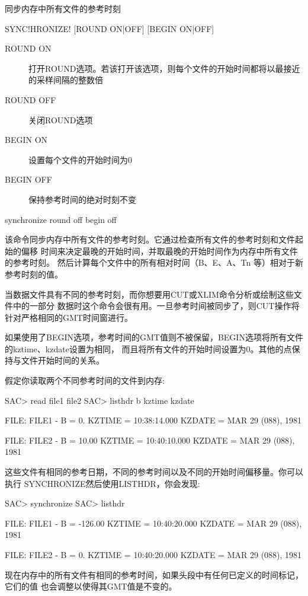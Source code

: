 \label{cmd:synchronize}

同步内存中所有文件的参考时刻

\begin{SACSTX}
SYNC!HRONIZE! [ROUND ON|OFF] [BEGIN ON|OFF]
\end{SACSTX}

\begin{description}
\item [ROUND ON] 打开ROUND选项。若该打开该选项，则每个文件的开始时间都将以最接近的采样间隔的整数倍
\item [ROUND OFF] 关闭ROUND选项 
\item [BEGIN ON] 设置每个文件的开始时间为0 
\item [BEGIN OFF] 保持参考时间的绝对时刻不变
\end{description}

\begin{SACDFT}
synchronize round off begin off
\end{SACDFT}

该命令同步内存中所有文件的参考时刻。它通过检查所有文件的参考时刻和文件起始的偏移
时间来决定最晚的开始时间，并取最晚的开始时间作为内存中所有文件的参考时刻。
然后计算每个文件中的所有相对时间（B、E、A、Tn 等）相对于新参考时刻的值。

当数据文件具有不同的参考时刻，而你想要用CUT或XLIM命令分析或绘制这些文件中的一部分
数据时这个命令会很有用。一旦参考时间被同步了，则CUT操作将针对严格相同的GMT时间窗进行。

如果使用了BEGIN选项，参考时间的GMT值则不被保留，BEGIN选项将所有文件的kztime、kzdate设置为相同，
而且将所有文件的开始时间设置为0。其他的点保持与文件开始时间的关系。

假定你读取两个不同参考时间的文件到内存:
\begin{SACCode}
SAC> read file1 file2
SAC> listhdr b kztime kzdate

  FILE: FILE1
  -
  B = 0.
  KZTIME = 10:38:14.000
  KZDATE = MAR 29 (088), 1981

  FILE: FILE2
  -
  B = 10.00
  KZTIME = 10:40:10.000
  KZDATE = MAR 29 (088), 1981
\end{SACCode}

这些文件有相同的参考日期，不同的参考时间以及不同的开始时间偏移量。你可以执行
SYNCHRONIZE然后使用LISTHDR，你会发现:
\begin{SACCode}
SAC> synchronize
SAC> listhdr

  FILE: FILE1
  -
  B = -126.00
  KZTIME = 10:40:20.000
  KZDATE = MAR 29 (088), 1981

  FILE: FILE2
  -
  B = 0.
  KZTIME = 10:40:20.000
  KZDATE = MAR 29 (088), 1981
\end{SACCode}
现在内存中的所有文件有相同的参考时间，如果头段中有任何已定义的时间标记，它们的值
也会调整以使得其GMT值是不变的。
